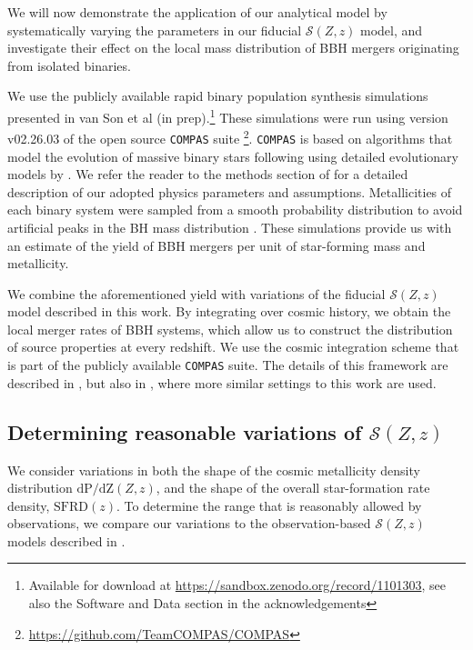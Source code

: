 \documentclass[twocolumn]{aastex631}
\newcommand{\SFRDzZ}{\ensuremath{\mathcal{S}(Z,z)}\xspace}
\newcommand{\SFRDz}{\ensuremath{\mathrm{SFRD}(z)}\xspace}
\newcommand{\dpdZ}{\ensuremath{\mathrm{dP/dZ}(Z,z)}\xspace}
\newcommand{\COMPAS}{{\tt COMPAS}\xspace}
\begin{document}
We will now demonstrate the application of our analytical model by systematically varying the parameters in our fiducial \SFRDzZ model, and investigate their effect on the local mass distribution of BBH mergers originating from isolated binaries. 


We use the publicly available rapid binary population synthesis simulations presented in van Son et al (in prep).\footnote{Available for download at \url{https://sandbox.zenodo.org/record/1101303},  see also the Software and Data section in the acknowledgements}  
These simulations were run using version v02.26.03 of the open source \COMPAS suite \citep{COMPAS_method}\footnote{\url{https://github.com/TeamCOMPAS/COMPAS}}. \COMPAS is based on algorithms that model the evolution of massive binary stars following \citet{Hurley+2000, Hurley+2002} using detailed evolutionary models by \citet{Pols+1998}.  We refer the reader to the methods section of \cite{vanson+2022} for a detailed description of our adopted physics parameters and assumptions.
%
Metallicities of each binary system were sampled from a smooth probability distribution to avoid artificial peaks in the BH mass distribution \citep[e.g.][]{Dominik2015,Kummer_thesis}. 
These simulations provide us with an estimate of the yield of BBH mergers per unit of star-forming mass and metallicity. 

We combine the aforementioned yield with variations of the fiducial \SFRDzZ model described in this work. By integrating over cosmic history, we obtain the local merger rates of BBH systems, which allow us to construct the distribution of source properties at every redshift. We use the cosmic integration scheme that is part of the publicly available \COMPAS suite. The details of this framework are described in \cite{Neijssel+2019}, but also in \cite{vanson+2022}, where more similar settings to this work are used. 


\subsection{Determining reasonable variations of \SFRDzZ \label{ss: reasonable var}}
We consider variations in both the shape of the cosmic metallicity density distribution \dpdZ, and the shape of the overall star-formation rate density, \SFRDz. To determine the range that is reasonably allowed by observations, we compare our variations to the observation-based \SFRDzZ models described in \cite{Chruslinska+2021}.
\end{document}

